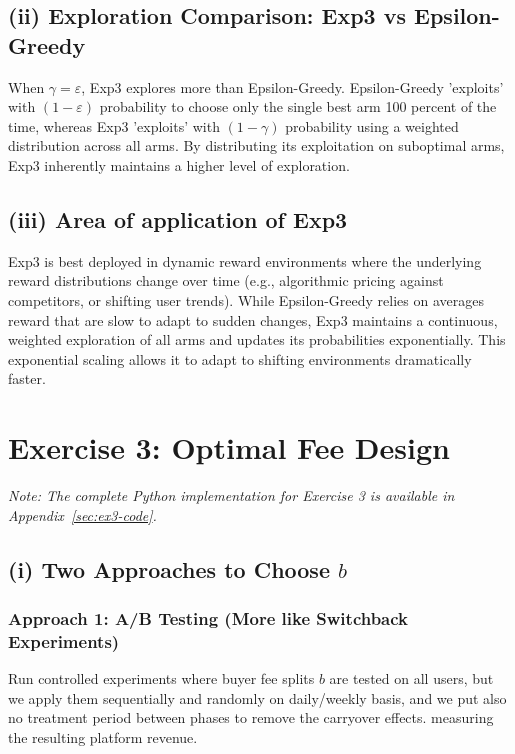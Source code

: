 \documentclass[12pt]{article}
\begin{document}
\subsection*{(ii) Exploration Comparison: Exp3 vs Epsilon-Greedy}

When $\gamma = \varepsilon$, Exp3 explores more than Epsilon-Greedy. Epsilon-Greedy 'exploits' with $(1-\varepsilon)$ probability to choose only the single best arm 100 percent of the time, whereas Exp3 'exploits' with $(1-\gamma)$ probability using a weighted distribution across all arms. By distributing its exploitation on suboptimal arms, Exp3 inherently maintains a higher level of exploration.

\subsection*{(iii) Area of application of Exp3}

Exp3 is best deployed in dynamic reward environments where the underlying reward distributions change over time (e.g., algorithmic pricing against competitors, or shifting user trends). While Epsilon-Greedy relies on averages reward that are slow to adapt to sudden changes, Exp3 maintains a continuous, weighted exploration of all arms and updates its probabilities exponentially. This exponential scaling allows it to adapt to shifting environments dramatically faster.

\newpage
\section*{Exercise 3: Optimal Fee Design}

\textit{Note: The complete Python implementation for Exercise 3 is available in Appendix~\ref{sec:ex3-code}.}
\subsection*{(i) Two Approaches to Choose $b$}

\subsubsection*{Approach 1: A/B Testing (More like Switchback Experiments)}

Run controlled experiments where buyer fee splits $b$ are tested on all users, but we apply them sequentially and randomly on daily/weekly basis, and we put also no treatment period between phases to remove the carryover effects. measuring the resulting platform revenue.
\end{document}
